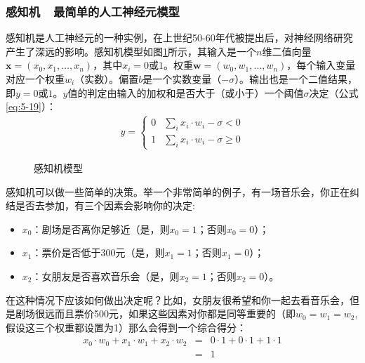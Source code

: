\vspace{-0.5em}
\subsubsection{感知机\ \dash \ 最简单的人工神经元模型}

\vspace{0.5em}
\parinterval 感知机是人工神经元的一种实例，在上世纪50-60年代被提出后，对神经网络研究产生了深远的影响。感知机模型如图\ref {fig:5-5}所示，其输入是一个$n$维二值向量$ \mathbf x=(x_0,x_1,\dots,x_n) $，其中$ x_i=0 $或$ 1 $。权重$ \mathbf w=(w_0,w_1,\dots,w_n) $，每个输入变量对应一个权重$ w_i $（实数）。偏置$ b $是一个实数变量（$ -\sigma $）。输出也是一个二值结果，即$ y=0 $或$ 1 $。$ y $值的判定由输入的加权和是否大于（或小于）一个阈值$ \sigma $决定（公式\ref{eq:5-19}）：
\begin{eqnarray}
y=\begin{cases} 0 & \sum_{i}{x_i\cdot w_i}-\sigma <0\\1 & \sum_{i}{x_i\cdot w_i}-\sigma \geqslant 0\end{cases}
\label{eq:5-19}
\end{eqnarray}

\begin{figure}[htp]
\centering

\caption{感知机模型}
\label{fig:5-5}
\end{figure}

\parinterval 感知机可以做一些简单的决策。举一个非常简单的例子，有一场音乐会，你正在纠结是否去参加，有三个因素会影响你的决定:

\begin{itemize}
\vspace{0.5em}
\item $ x_0 $：剧场是否离你足够近（是，则$ x_0=1 $；否则$ x_0=0 $）；
\vspace{0.5em}
\item $ x_1 $：票价是否低于300元（是，则$ x_1=1 $；否则$ x_1=0 $）；
\vspace{0.5em}
\item $ x_2 $：女朋友是否喜欢音乐会（是，则$ x_2=1 $；否则$ x_2=0 $）。
\vspace{0.5em}
\end{itemize}

\parinterval 在这种情况下应该如何做出决定呢？比如，女朋友很希望和你一起去看音乐会，但是剧场很远而且票价500元，如果这些因素对你都是同等重要的（即$ w_0=w_1=w_2 $,假设这三个权重都设置为1）那么会得到一个综合得分：
\begin{eqnarray}
x_0\cdot w_0+x_1\cdot w_1+x_2\cdot w_2 & = & 0\cdot 1+0\cdot 1+1\cdot 1 \nonumber \\
                                                                     & = & 1
\label{eq:5-20}
\end{eqnarray}

